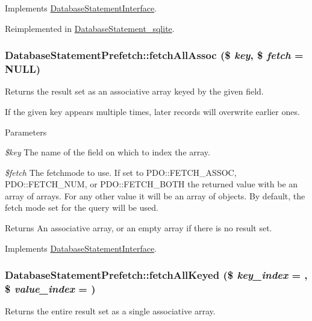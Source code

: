 Implements \hyperlink{interfaceDatabaseStatementInterface_a716e454a44a7667f7a90b90c1a6fe3eb}{DatabaseStatementInterface}.

Reimplemented in \hyperlink{classDatabaseStatement__sqlite_a2b23f3a9e83efae1690475b7c6cda0a8}{DatabaseStatement\_\-sqlite}.\hypertarget{classDatabaseStatementPrefetch_a74915ad2c601fa0bf4a9a43ad6180a94}{
\subsubsection[{fetchAllAssoc}]{\setlength{\rightskip}{0pt plus 5cm}DatabaseStatementPrefetch::fetchAllAssoc (\$ {\em key}, \/  \$ {\em fetch} = {\ttfamily NULL})}}
\label{classDatabaseStatementPrefetch_a74915ad2c601fa0bf4a9a43ad6180a94}
Returns the result set as an associative array keyed by the given field.

If the given key appears multiple times, later records will overwrite earlier ones.


\begin{DoxyParams}{Parameters}
\item[{\em \$key}]The name of the field on which to index the array. \item[{\em \$fetch}]The fetchmode to use. If set to PDO::FETCH\_\-ASSOC, PDO::FETCH\_\-NUM, or PDO::FETCH\_\-BOTH the returned value with be an array of arrays. For any other value it will be an array of objects. By default, the fetch mode set for the query will be used.\end{DoxyParams}
\begin{DoxyReturn}{Returns}
An associative array, or an empty array if there is no result set. 
\end{DoxyReturn}


Implements \hyperlink{interfaceDatabaseStatementInterface_a8be68ba0a27dc2f5358c5bcf3243108b}{DatabaseStatementInterface}.\hypertarget{classDatabaseStatementPrefetch_af374c6fa26265fe1cf9cd0cf87260849}{
\subsubsection[{fetchAllKeyed}]{\setlength{\rightskip}{0pt plus 5cm}DatabaseStatementPrefetch::fetchAllKeyed (\$ {\em key\_\-index} = {}, \/  \$ {\em value\_\-index} = {})}}
\label{classDatabaseStatementPrefetch_af374c6fa26265fe1cf9cd0cf87260849}
Returns the entire result set as a single associative array.

